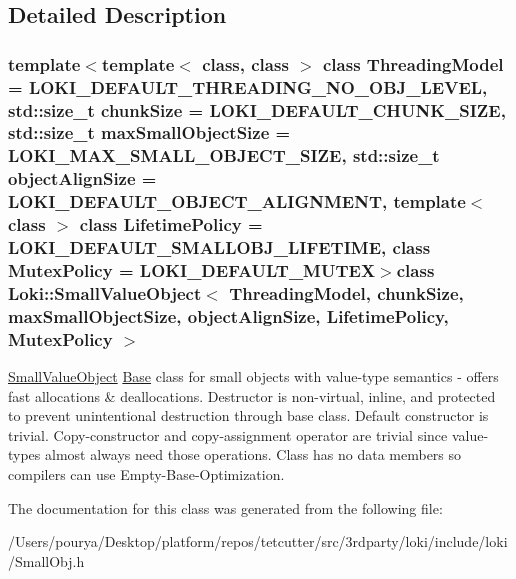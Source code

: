 \subsection{Detailed Description}
\subsubsection*{template$<$template$<$ class, class $>$ class Threading\+Model = L\+O\+K\+I\+\_\+\+D\+E\+F\+A\+U\+L\+T\+\_\+\+T\+H\+R\+E\+A\+D\+I\+N\+G\+\_\+\+N\+O\+\_\+\+O\+B\+J\+\_\+\+L\+E\+V\+E\+L, std\+::size\+\_\+t chunk\+Size = L\+O\+K\+I\+\_\+\+D\+E\+F\+A\+U\+L\+T\+\_\+\+C\+H\+U\+N\+K\+\_\+\+S\+I\+Z\+E, std\+::size\+\_\+t max\+Small\+Object\+Size = L\+O\+K\+I\+\_\+\+M\+A\+X\+\_\+\+S\+M\+A\+L\+L\+\_\+\+O\+B\+J\+E\+C\+T\+\_\+\+S\+I\+Z\+E, std\+::size\+\_\+t object\+Align\+Size = L\+O\+K\+I\+\_\+\+D\+E\+F\+A\+U\+L\+T\+\_\+\+O\+B\+J\+E\+C\+T\+\_\+\+A\+L\+I\+G\+N\+M\+E\+N\+T, template$<$ class $>$ class Lifetime\+Policy = L\+O\+K\+I\+\_\+\+D\+E\+F\+A\+U\+L\+T\+\_\+\+S\+M\+A\+L\+L\+O\+B\+J\+\_\+\+L\+I\+F\+E\+T\+I\+M\+E, class Mutex\+Policy = L\+O\+K\+I\+\_\+\+D\+E\+F\+A\+U\+L\+T\+\_\+\+M\+U\+T\+E\+X$>$class Loki\+::\+Small\+Value\+Object$<$ Threading\+Model, chunk\+Size, max\+Small\+Object\+Size, object\+Align\+Size, Lifetime\+Policy, Mutex\+Policy $>$}

\hyperlink{classLoki_1_1SmallValueObject}{Small\+Value\+Object} \hyperlink{structBase}{Base} class for small objects with value-\/type semantics -\/ offers fast allocations \& deallocations. Destructor is non-\/virtual, inline, and protected to prevent unintentional destruction through base class. Default constructor is trivial. Copy-\/constructor and copy-\/assignment operator are trivial since value-\/types almost always need those operations. Class has no data members so compilers can use Empty-\/\+Base-\/\+Optimization. 

The documentation for this class was generated from the following file\+:\begin{DoxyCompactItemize}
\item 
/\+Users/pourya/\+Desktop/platform/repos/tetcutter/src/3rdparty/loki/include/loki/Small\+Obj.\+h\end{DoxyCompactItemize}
